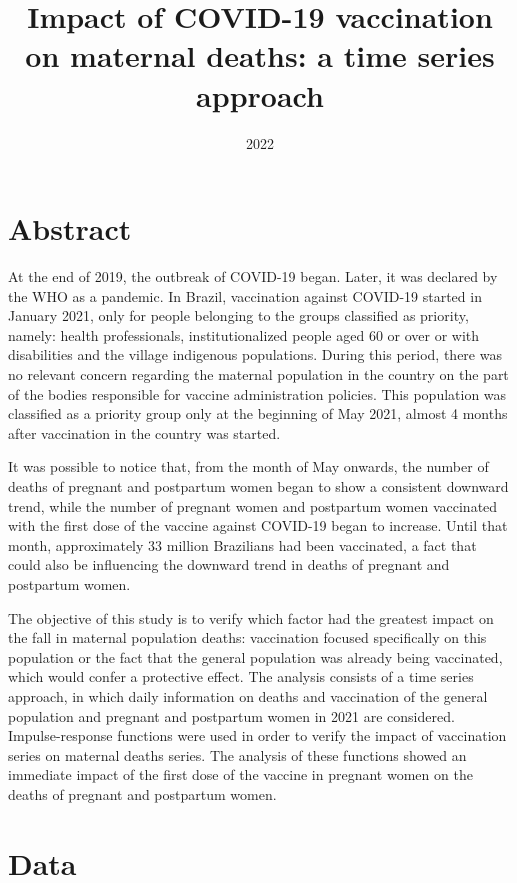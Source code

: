 \documentclass[
]{article}
\title{Impact of COVID-19 vaccination on maternal deaths: a time series
approach}
\author{}
\date{\vspace{-2.5em}2022}
\begin{document}
\maketitle

{
\setcounter{tocdepth}{3}
\tableofcontents
}
\newpage

\section{Abstract}

At the end of 2019, the outbreak of COVID-19 began. Later, it was
declared by the WHO as a pandemic. In Brazil, vaccination against
COVID-19 started in January 2021, only for people belonging to the
groups classified as priority, namely: health professionals,
institutionalized people aged 60 or over or with disabilities and the
village indigenous populations. During this period, there was no
relevant concern regarding the maternal population in the country on the
part of the bodies responsible for vaccine administration policies. This
population was classified as a priority group only at the beginning of
May 2021, almost 4 months after vaccination in the country was started.

It was possible to notice that, from the month of May onwards, the
number of deaths of pregnant and postpartum women began to show a
consistent downward trend, while the number of pregnant women and
postpartum women vaccinated with the first dose of the vaccine against
COVID-19 began to increase. Until that month, approximately 33 million
Brazilians had been vaccinated, a fact that could also be influencing
the downward trend in deaths of pregnant and postpartum women.

The objective of this study is to verify which factor had the greatest
impact on the fall in maternal population deaths: vaccination focused
specifically on this population or the fact that the general population
was already being vaccinated, which would confer a protective effect.
The analysis consists of a time series approach, in which daily
information on deaths and vaccination of the general population and
pregnant and postpartum women in 2021 are considered. Impulse-response
functions were used in order to verify the impact of vaccination series
on maternal deaths series. The analysis of these functions showed an
immediate impact of the first dose of the vaccine in pregnant women on
the deaths of pregnant and postpartum women.

\section{Data}
\end{document}
